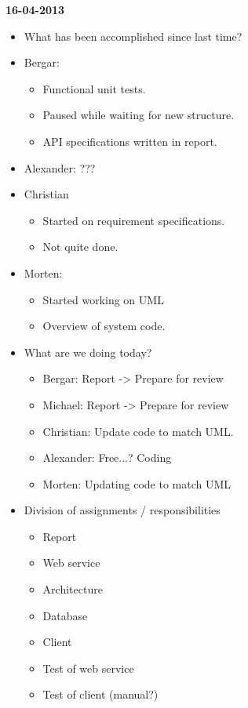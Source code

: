 \documentclass[11pt]{article}
\begin{document}
\begin{landscape}
\begin{multicols}{2}
\textbf{16-04-2013}
\begin{itemize}
\item What has been accomplished since last time?
\item Bergar:
\begin{itemize}
\item Functional unit tests.
\item Paused while waiting for new structure.
\item API specifications written in report.
\end{itemize}
\item Alexander: ???
\item Christian
\begin{itemize}
\item Started on requirement specifications.
\item Not quite done.
\end{itemize}
\item Morten:
\begin{itemize}
\item Started working on UML
\item Overview of system code.
\end{itemize}
\item What are we doing today?
\begin{itemize}
\item Bergar: Report -> Prepare for review
\item Michael: Report -> Prepare for review
\item Christian: Update code to match UML.
\item Alexander: Free...? Coding
\item Morten: Updating code to match UML
\end{itemize}
\item Division of assignments / responsibilities
\begin{itemize}
\item Report
\item Web service
\item Architecture
\item Database
\item Client
\item Test of web service
\item Test of client (manual?)
\end{itemize}
\end{itemize}


\end{multicols}
\end{landscape}
\end{document}
